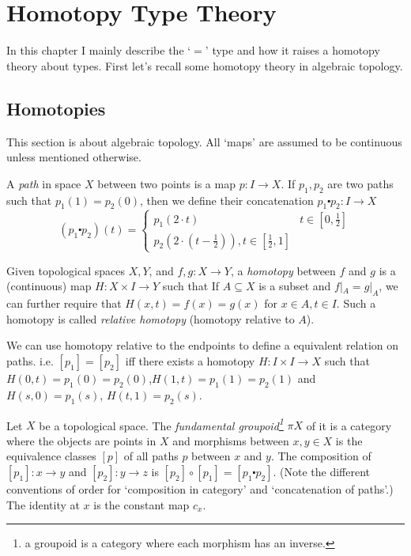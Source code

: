 \chapter{Homotopy Type Theory}
\label{HoTT}

In this chapter I mainly describe the `$=$' type and how it raises
a homotopy theory about types. First let's recall some homotopy theory
in algebraic topology.

\section{Homotopies}

This section is about algebraic topology. All `maps' are assumed to be
continuous unless mentioned otherwise. 

\begin{definition}
    \label{path}
    A {\it path} in space $X$ between two points is a map $p: I\to X$.
    If $p_1,p_2$ are two paths such that $p_1(1)=p_2(0)$, then we
    define their concatenation $p_1\centerdot p_2: I\to X$
    $$
        (p_1\centerdot p_2)(t) = \begin{cases}
            p_1(2\cdot t) & t\in[0,\frac{1}{2}] \\
            p_2(2\cdot(t-\frac{1}{2})), t\in[\frac{1}{2}, 1]
        \end{cases}
    $$
\end{definition}

\begin{definition}
    \label{homotopy}
    Given topological spaces $X,Y$, and $f,g:X\to Y$, a {\it homotopy} between
    $f$ and $g$ is a (continuous) map $H:X\times I\to Y$ such that
    If $A\subseteq X$ is a subset and $f|_A=g|_A$, we can further require
    that $H(x, t)=f(x)=g(x)$ for $x\in A,t\in I$. Such a homotopy is called
    {\it relative homotopy} (homotopy relative to $A$). 
\end{definition}

We can use homotopy relative to the endpoints to define a equivalent
relation on paths. i.e. $[p_1]=[p_2]$ iff there exists a homotopy 
$H: I\times I\to X$ such that $H(0, t)=p_1(0)=p_2(0)$,$
H(1,t)=p_1(1)=p_2(1)$ and $H(s,0)=p_1(s)$, $H(t,1)=p_2(s)$.

\begin{definition}
    \label{fundamental-groupoid}
    Let $X$ be a topological space. The {\it fundamental groupoid\footnote{
        a groupoid is a category where each morphism has an inverse.
    }} $\pi X$ of it is
    a category where the objects are points in $X$ and morphisms
    between $x,y\in X$ is the equivalence classes $[p]$ of all paths
    $p$ between $x$ and $y$.
    The composition of $[p_1]: x\to y$ and $[p_2]:y\to z$ is
    $[p_2]\circ[p_1]=[p_1\centerdot p_2]$. (Note the different conventions
    of order for `composition in category' and `concatenation of paths'.)
    The identity at $x$ is the constant map $c_x$.
\end{definition}

